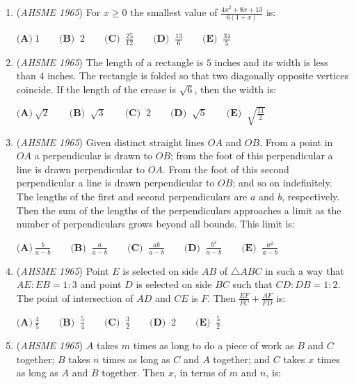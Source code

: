 \begin{enumerate}
 $\textbf{(A)}\ 5 \qquad  \textbf{(B) }\ 6 \qquad  \textbf{(C) }\ 7 \qquad  \textbf{(D) }\ 8 \qquad  \textbf{(E) }\ 9$


	\item (\textit{AHSME 1965}) For $x \ge 0$ the smallest value of $\frac {4x^2 + 8x + 13}{6(1 + x)}$ is: 


 $\textbf{(A)}\ 1 \qquad  \textbf{(B) }\ 2 \qquad  \textbf{(C) }\ \frac {25}{12} \qquad  \textbf{(D) }\ \frac{13}{6}\qquad \textbf{(E) }\ \frac{34}{5}$


	\item (\textit{AHSME 1965}) The length of a rectangle is $5$ inches and its width is less than $4$ inches. The rectangle is folded so that two 
diagonally opposite vertices coincide. If the length of the crease is $\sqrt {6}$, then the width is: 


 $\textbf{(A)}\ \sqrt {2} \qquad  \textbf{(B) }\ \sqrt {3} \qquad  \textbf{(C) }\ 2 \qquad  \textbf{(D) }\ \sqrt{5}\qquad \textbf{(E) }\ \sqrt{\frac{11}{2}}$


	\item (\textit{AHSME 1965}) Given distinct straight lines $OA$ and $OB$. From a point in $OA$ a perpendicular is drawn to $OB$; 
from the foot of this perpendicular a line is drawn perpendicular to $OA$. 
From the foot of this second perpendicular a line is drawn perpendicular to $OB$; 
and so on indefinitely. The lengths of the first and second perpendiculars are $a$ and $b$, respectively. 
Then the sum of the lengths of the perpendiculars approaches a limit as the number of perpendiculars grows beyond all bounds. This limit is: 


 $\textbf{(A)}\ \frac {b}{a - b} \qquad  \textbf{(B) }\ \frac {a}{a - b} \qquad  \textbf{(C) }\ \frac {ab}{a - b} \qquad  \textbf{(D) }\ \frac{b^2}{a-b}\qquad \textbf{(E) }\ \frac{a^2}{a-b}$


	\item (\textit{AHSME 1965}) Point $E$ is selected on side $AB$ of $\triangle{ABC}$ in such a way that $AE: EB = 1: 3$ and point $D$ is selected on side $BC$ 
such that $CD: DB = 1: 2$. The point of intersection of $AD$ and $CE$ is $F$. Then $\frac {EF}{FC} + \frac {AF}{FD}$ is: 


 $\textbf{(A)}\ \frac {4}{5} \qquad  \textbf{(B) }\ \frac {5}{4} \qquad  \textbf{(C) }\ \frac {3}{2} \qquad  \textbf{(D) }\ 2\qquad \textbf{(E) }\ \frac{5}{2}$


	\item (\textit{AHSME 1965}) $A$ takes $m$ times as long to do a piece of work as $B$ and $C$ together; $B$ takes $n$ times as long as $C$ and $A$ together; 
and $C$ takes $x$ times as long as $A$ and $B$ together. Then $x$, in terms of $m$ and $n$, is: 



\end{enumerate}
